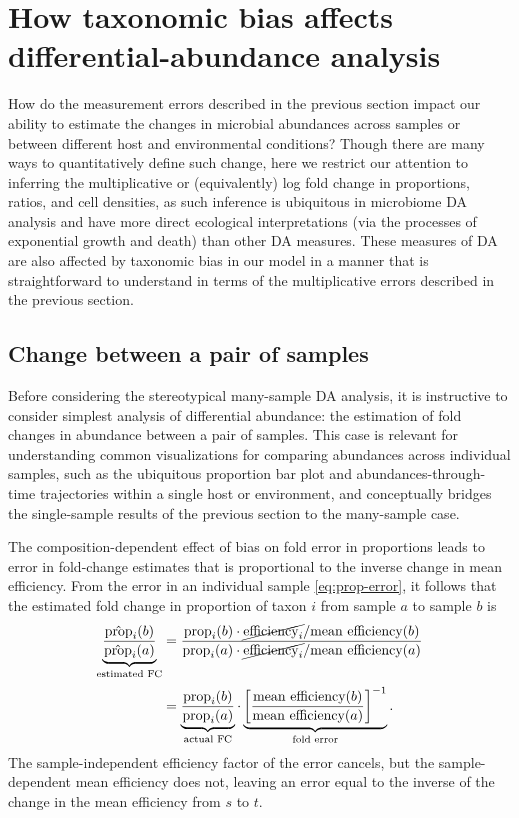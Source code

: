 \documentclass[
]{article}
\theoremstyle{definition}
\theoremstyle{definition}
\theoremstyle{definition}
\theoremstyle{definition}
\theoremstyle{remark}
\begin{document}
\hypertarget{differential-abundance}{%
\section{How taxonomic bias affects differential-abundance analysis}\label{differential-abundance}}

How do the measurement errors described in the previous section impact our ability to estimate the changes in microbial abundances across samples or between different host and environmental conditions?
Though there are many ways to quantitatively define such change, here we restrict our attention to inferring the multiplicative or (equivalently) log fold change in proportions, ratios, and cell densities, as such inference is ubiquitous in microbiome DA analysis and have more direct ecological interpretations (via the processes of exponential growth and death) than other DA measures.
These measures of DA are also affected by taxonomic bias in our model in a manner that is straightforward to understand in terms of the multiplicative errors described in the previous section.

\hypertarget{change-between-a-pair-of-samples}{%
\subsection{Change between a pair of samples}\label{change-between-a-pair-of-samples}}

Before considering the stereotypical many-sample DA analysis, it is instructive to
consider simplest analysis of differential abundance: the estimation of fold changes in abundance between a pair of samples.
This case is relevant for understanding common visualizations for comparing abundances across individual samples, such as the ubiquitous proportion bar plot and abundances-through-time trajectories within a single host or environment, and conceptually bridges the single-sample results of the previous section to the many-sample case.

The composition-dependent effect of bias on fold error in proportions leads to error in fold-change estimates that is proportional to the inverse change in mean efficiency.
From the error in an individual sample \eqref{eq:prop-error}, it follows that the estimated fold change in proportion of taxon \(i\) from sample \(a\) to sample \(b\) is
\begin{align}
  \label{eq:prop-fc-error}
\underbrace{\frac{\hat{\text{prop}}_{i}(b)}{\hat{\text{prop}}_{i}(a)}} _\text{estimated FC}
  &= \frac
    {\text{prop}_{i}(b) \cdot \cancel{\text{efficiency}_{i}} / {\text{mean efficiency}(b)}}
    {\text{prop}_{i}(a) \cdot \cancel{\text{efficiency}_{i}} / {\text{mean efficiency}(a)}}
\\[0.5ex]
  &=
  \underbrace{\frac{\text{prop}_{i}(b)}{\text{prop}_{i}(a)}}_\text{actual FC}
  \cdot
  \underbrace{\left[\frac{\text{mean efficiency}(b)}{\text{mean efficiency}(a)}\right]^{-1}}_\text{fold error}
  .
\end{align}
The sample-independent efficiency factor of the error cancels, but the sample-dependent mean efficiency does not, leaving an error equal to the inverse of the change in the mean efficiency from \(s\) to \(t\).
\end{document}
